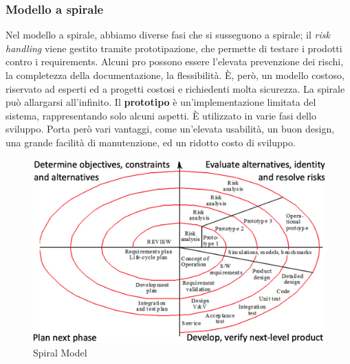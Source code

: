 \documentclass[11pt]{article}
\begin{document}
\subsubsection{Modello a spirale}
Nel modello a spirale, abbiamo diverse fasi che si susseguono a spirale; il \textit{risk handling} viene gestito tramite prototipazione, che permette di testare i prodotti contro i requirements. Alcuni pro possono essere l'elevata prevenzione dei rischi, la completezza della documentazione, la flessibilità. È, però, un modello costoso, riservato ad esperti ed a progetti costosi e richiedenti molta sicurezza. La spirale può allargarsi all'infinito. Il \textbf{prototipo} è un'implementazione limitata del sistema, rappresentando solo alcuni aspetti. È utilizzato in varie fasi dello sviluppo. Porta però vari vantaggi, come un'elevata usabilità, un buon design, una grande facilità di manutenzione, ed un ridotto costo di sviluppo. 
\begin{figure}[H]
    \centering
    \includegraphics[width=\linewidth]{res/teoria/SpiralModel.png}
    \caption{Spiral Model}
\end{figure}
\end{document}
